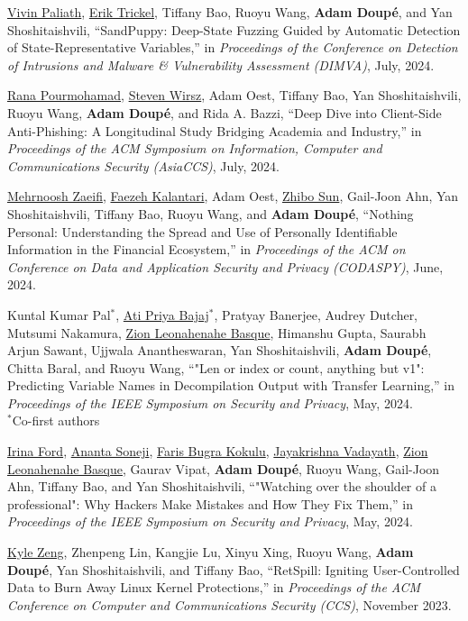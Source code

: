 \documentclass[11pt,letterpaper,sans]{moderncv}
\begin{document}
\begin{etaremune}
\item \underline{Vivin Paliath}, \underline{Erik Trickel}, Tiffany Bao, Ruoyu Wang, \textbf{Adam Doup\'e}, and Yan Shoshitaishvili, ``SandPuppy: Deep-State Fuzzing Guided by Automatic Detection of State-Representative Variables,'' in \emph{Proceedings of the Conference on Detection of Intrusions and Malware {\&} Vulnerability Assessment (DIMVA)}, July, 2024.

\item \underline{Rana Pourmohamad}, \underline{Steven Wirsz}, Adam Oest, Tiffany Bao, Yan Shoshitaishvili, Ruoyu Wang, \textbf{Adam Doup\'e}, and Rida A. Bazzi, ``Deep Dive into Client-Side Anti-Phishing: A Longitudinal Study Bridging Academia and Industry,'' in \emph{Proceedings of the ACM Symposium on Information, Computer and Communications Security (AsiaCCS)}, July, 2024.

\item \underline{Mehrnoosh Zaeifi}, \underline{Faezeh Kalantari}, Adam Oest, \underline{Zhibo Sun}, Gail-Joon Ahn, Yan Shoshitaishvili, Tiffany Bao, Ruoyu Wang, and \textbf{Adam Doup\'e}, ``Nothing Personal: Understanding the Spread and Use of Personally Identifiable Information in the Financial Ecosystem,'' in \emph{Proceedings of the ACM on Conference on Data and Application Security and Privacy (CODASPY)}, June, 2024.

\item Kuntal Kumar Pal$^*$, \underline{Ati Priya Bajaj}$^*$, Pratyay Banerjee, Audrey Dutcher, Mutsumi Nakamura, \underline{Zion Leonahenahe Basque}, Himanshu Gupta, Saurabh Arjun Sawant, Ujjwala Anantheswaran, Yan Shoshitaishvili, \textbf{Adam Doup\'e}, Chitta Baral, and Ruoyu Wang, ``"Len or index or count, anything but v1": Predicting Variable Names in Decompilation Output with Transfer Learning,'' in \emph{Proceedings of the IEEE Symposium on Security and Privacy}, May, 2024. \\
  $^*$Co-first authors

\item \underline{Irina Ford}, \underline{Ananta Soneji}, \underline{Faris Bugra Kokulu}, \underline{Jayakrishna Vadayath}, \underline{Zion Leonahenahe Basque}, Gaurav Vipat, \textbf{Adam Doup\'e}, Ruoyu Wang, Gail-Joon Ahn, Tiffany Bao, and Yan Shoshitaishvili, ``"Watching over the shoulder of a professional": Why Hackers Make Mistakes and How They Fix Them,'' in \emph{Proceedings of the IEEE Symposium on Security and Privacy}, May, 2024.

\item \underline{Kyle Zeng}, Zhenpeng Lin, Kangjie Lu, Xinyu Xing, Ruoyu Wang, \textbf{Adam Doup\'e}, Yan Shoshitaishvili, and Tiffany Bao, ``RetSpill: Igniting User-Controlled Data to Burn Away Linux Kernel Protections,'' in \emph{Proceedings of the ACM Conference on Computer and Communications Security (CCS)}, November 2023.


\end{etaremune}
\end{document}
